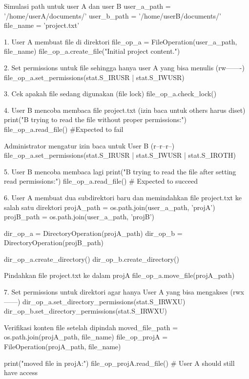 \documentclass[12pt]{article}
\begin{document}
\begin{python}
Simulasi path untuk user A dan user B
    user_a_path = '/home/userA/documents/'
    user_b_path = '/home/userB/documents/'
    file_name = 'project.txt'
    
    1. User A membuat file di direktori
    file_op_a = FileOperation(user_a_path, file_name)
    file_op_a.create_file("Initial project content.\n")
    
    2. Set permissions untuk file sehingga hanya user A yang bisa menulis (rw-------)
    file_op_a.set_permissions(stat.S_IRUSR | stat.S_IWUSR)
    
    3. Cek apakah file sedang digunakan (file lock)
    file_op_a.check_lock()
    
    4. User B mencoba membaca file project.txt (izin baca untuk others harus diset)
    print("\nUser B trying to read the file without proper permissions:")
    file_op_a.read_file()  #Expected to fail
    
    Administrator mengatur izin baca untuk User B (r--r--r--)
    file_op_a.set_permissions(stat.S_IRUSR | stat.S_IWUSR | stat.S_IROTH)
    
    5. User B mencoba membaca lagi
    print("\nUser B trying to read the file after setting read permissions:")
    file_op_a.read_file()  # Expected to succeed
    
    6. User A membuat dua subdirektori baru dan memindahkan file project.txt ke salah satu direktori
    projA_path = os.path.join(user_a_path, 'projA')
    projB_path = os.path.join(user_a_path, 'projB')
    
    dir_op_a = DirectoryOperation(projA_path)
    dir_op_b = DirectoryOperation(projB_path)
    
    dir_op_a.create_directory()
    dir_op_b.create_directory()
    
    Pindahkan file project.txt ke dalam projA
    file_op_a.move_file(projA_path)
    
    7. Set permissions untuk direktori agar hanya User A yang bisa mengakses (rwx------)
    dir_op_a.set_directory_permissions(stat.S_IRWXU)
    dir_op_b.set_directory_permissions(stat.S_IRWXU)
    
    Verifikasi konten file setelah dipindah
    moved_file_path = os.path.join(projA_path, file_name)
    file_op_projA = FileOperation(projA_path, file_name)
    
    print("\nVerifying moved file in projA:")
    file_op_projA.read_file() # User A should still have access

\end{python}
\end{document}
